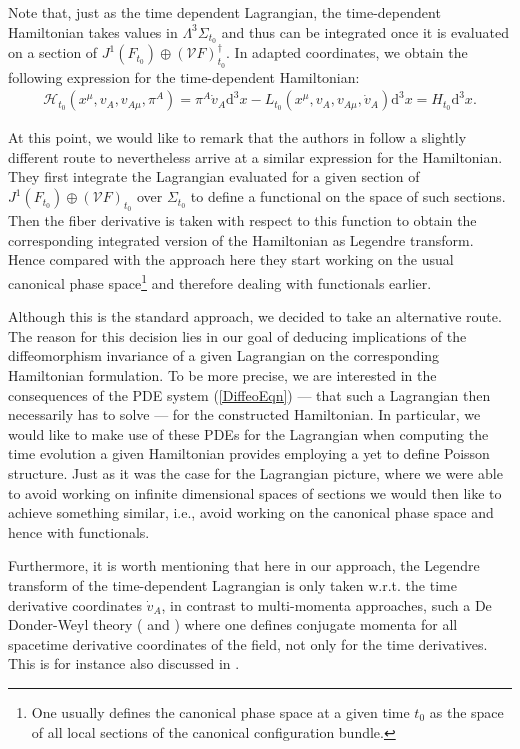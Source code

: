 Note that, just as the time dependent Lagrangian, the time-dependent Hamiltonian takes values in $\Lambda^3\Sigma_{t_0}$ and thus can be integrated once it is evaluated on a section of  $J^1(F_{t_0}) \oplus (\mathcal{V}F)_{t_0}^{\dagger}$.
In adapted coordinates, we obtain the following expression for the time-dependent Hamiltonian:
\begin{align}
    \mathcal{H}_{t_0}(x^\mu, v_A, v_{A\mu},\pi^A) = \pi^A \dot{v}_A \mathrm{d}^3x - L_{t_0}(x^\mu,v_A,v_{A\mu},\dot{v}_A) \mathrm{d}^3x = H_{t_0} \mathrm{d}^3x.
\end{align}

At this point, we would like to remark that the authors in \cite{2004math.ph..11032G} follow a slightly different route to nevertheless arrive at a similar expression for the Hamiltonian. They first integrate the Lagrangian evaluated for a given section of $J^1(F_{t_0}) \oplus (\mathcal{V}F)_{t_0}$ over $\Sigma_{t_0}$ to define a functional on the space of such sections. Then the fiber derivative is taken with respect to this function to obtain the corresponding integrated version of the Hamiltonian as Legendre transform. 
Hence compared with the approach here they start working on the usual canonical phase space\footnote{One usually defines the canonical phase space at a given time $t_0$ as the space of all local sections of the canonical configuration bundle.} and therefore dealing with functionals earlier. 

Although this is the standard approach, we decided to take an alternative route. The reason for this decision lies in our goal of deducing implications of the diffeomorphism invariance of a given Lagrangian on the corresponding Hamiltonian formulation. To be more precise, we are interested in the consequences of the PDE system (\ref{DiffeoEqn}) --- that such a Lagrangian then necessarily has to solve --- for the constructed Hamiltonian. In particular, we would like to make use of these PDEs for the Lagrangian when computing the time evolution a given Hamiltonian provides employing a yet to define Poisson structure. Just as it was the case for the Lagrangian picture, where we were able to avoid working on infinite dimensional spaces of sections we would then like to achieve something similar, i.e., avoid working on the canonical phase space and hence with functionals.

Furthermore, it is worth mentioning that here in our approach, the Legendre transform of the time-dependent Lagrangian is only taken w.r.t. the time derivative coordinates $\dot{v}_A$, in contrast to multi-momenta approaches, such a De Donder-Weyl theory (\cite{deDonder} and \cite{Weyl}) where one defines conjugate momenta for all spacetime derivative coordinates of the field, not only for the time derivatives. This is for instance also discussed in \cite{1998physics...1019G}. 

